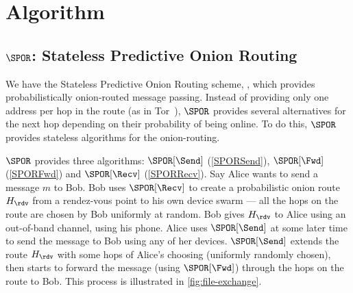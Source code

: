 \section{Algorithm}%
\label{Algorithm}


\newcommand{\Alice}{\ensuremath{\mathscr{A}}}
\newcommand{\Bob}{\ensuremath{\mathscr{B}}}

\newcommand{\localoverlay}{Squad Overlay\xspace}
\newcommand{\globaloverlay}{Global Overlay\xspace}


\subsection{\(\SPOR\): Stateless Predictive Onion Routing}


We have the Stateless Predictive Onion Routing scheme, \SPOR, which provides 
probabilistically onion-routed message passing.
Instead of providing only one address per hop in the route (as in \eg 
Tor~\cite{Tor}), \(\SPOR\) provides several alternatives for the next hop 
depending on their probability of being online.
To do this, \(\SPOR\) provides stateless algorithms for the onion-routing.

\(\SPOR\) provides three algorithms: \(\SPOR[\Send]\) (\cref{SPORSend}), 
\(\SPOR[\Fwd]\) (\cref{SPORFwd}) and \(\SPOR[\Recv]\) (\cref{SPORRecv}).
Say Alice wants to send a message \(m\) to Bob.
Bob uses \(\SPOR[\Recv]\) to create a probabilistic onion route \(H_\rdv\) from 
a rendez-vous point to his own device swarm --- all the hops on the route are 
chosen by Bob uniformly at random.
Bob gives \(H_\rdv\) to Alice using an out-of-band channel, \eg using his phone.
Alice uses \(\SPOR[\Send]\) at some later time to send the message to Bob using 
any of her devices.
\(\SPOR[\Send]\) extends the route \(H_\rdv\) with some hops of Alice's choosing 
(uniformly randomly chosen), then starts to forward the message (using 
\(\SPOR[\Fwd]\)) through the hops on the route to Bob.
This process is illustrated in \cref{fig:file-exchange}.

